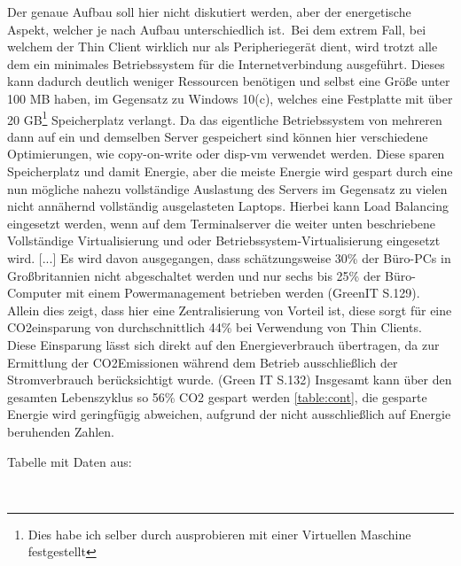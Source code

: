 \documentclass{wseminar}
\begin{document}
\begin{sloppypar}
Der genaue Aufbau soll hier nicht diskutiert werden, aber der energetische Aspekt, welcher je nach Aufbau unterschiedlich ist.\
Bei dem extrem Fall, bei welchem der Thin Client wirklich nur als Peripheriegerät dient, wird trotzt alle dem ein minimales Betriebssystem für die Internetverbindung ausgeführt.
Dieses kann dadurch deutlich weniger Ressourcen benötigen und selbst eine Größe unter 100 MB\citeurl{tiny-core} haben, im Gegensatz zu Windows 10(c), welches eine Festplatte mit über 20 GB\footnote{Dies habe ich selber durch ausprobieren mit einer Virtuellen Maschine festgestellt} Speicherplatz verlangt.   %
Da das eigentliche Betriebssystem von mehreren dann auf ein und demselben Server gespeichert sind können hier verschiedene Optimierungen, wie \gls{copy-on-write} oder \gls{disp-vm} verwendet werden.
Diese sparen Speicherplatz und damit Energie, aber die meiste Energie wird gespart durch eine nun mögliche nahezu vollständige Auslastung des Servers im Gegensatz zu vielen nicht annähernd vollständig ausgelasteten Laptops.
Hierbei kann Load Balancing eingesetzt werden, wenn auf dem Terminalserver die weiter unten beschriebene Vollständige Virtualisierung und oder Betriebssystem-Virtualisierung eingesetzt wird.
[...]
Es wird davon ausgegangen, dass schätzungsweise 30\% der Büro-PCs in Großbritannien nicht abgeschaltet werden und nur sechs bis 25\% der Büro-Computer mit einem Powermanagement betrieben werden (GreenIT S.129).
Allein dies zeigt, dass hier eine Zentralisierung von Vorteil ist, diese sorgt für eine CO2einsparung von durchschnittlich 44\% bei Verwendung von Thin Clients. Diese Einsparung lässt sich direkt auf den Energieverbrauch übertragen, da zur Ermittlung der CO2Emissionen während dem Betrieb ausschließlich der Stromverbrauch berücksichtigt wurde. (Green IT S.132)
Insgesamt kann über den gesamten Lebenszyklus so 56\% CO2 gespart werden \autoref{table:cont}, die gesparte Energie wird geringfügig abweichen, aufgrund der nicht ausschließlich auf Energie beruhenden Zahlen.
\begin{table}
    \centering
{}
\caption{Tabelle mit Daten aus: }
\label{table:cont}
\end{table}\\
	\pagebreak
	

\end{sloppypar}
\end{document}
